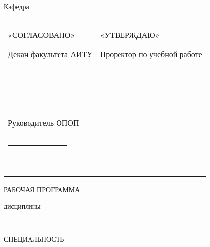 

\thispagestyle{empty}%
\begin{center}%
\MakeUppercase{\Ministry}
\end{center}%
%
\begin{center}%
\OrganizationNameFirst
\par
\OrganizationNameSecond
\end{center}%

\begin{center}%
Кафедра ~\AuthorDepartment
\end{center}%

%
\vspace{0pt plus4fill} 
%
\begin{tabularx}{\textwidth}{p{}p{}}
	«СОГЛАСОВАНО»\par
	Декан факультета АИТУ\par
	\underline{~~~~~~~~~~~~~~~} \SignedDecan~\par
	\SignedDate~\par & 
	«УТВЕРЖДАЮ»\par
	Проректор по учебной работе\par
	\underline{~~~~~~~~~~~~~~~} \SignedStudyHead~\par
	\SignedDate~\\
	Руководитель ОПОП\par
	\underline{~~~~~~~~~~~~~~~} \SignedOPOPHead~\par
	\SignedDate~\par &~\\   	
\end{tabularx}

\vspace{0pt plus6fill} 
\begin{center}%
{\large РАБОЧАЯ ПРОГРАММА}\par
дисциплины \par
\textbf{\DisciplineCode}~\MakeUppercase{\DisciplineName}
\end{center}%

\vspace{0pt plus6fill} 
\begin{center}%
{\large СПЕЦИАЛЬНОСТЬ}\par
\textbf{\SpecialityCode}~\MakeUppercase{\SpecialityName}
\end{center}%

